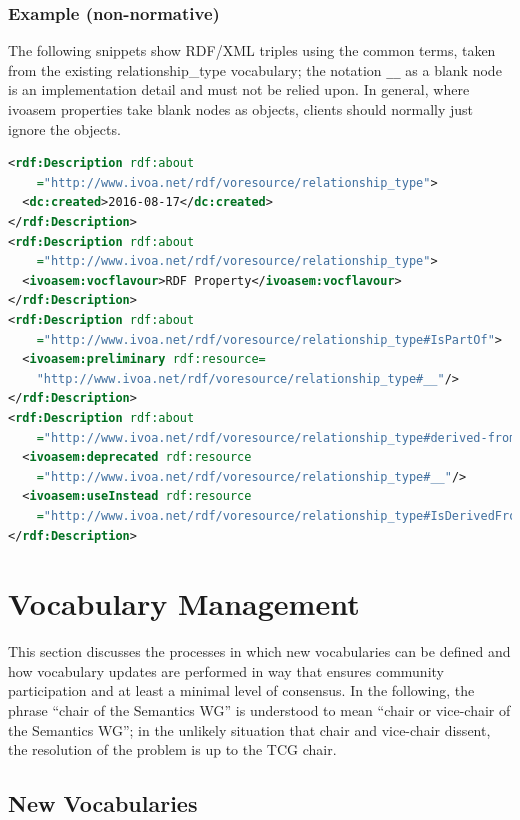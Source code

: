 \documentclass[11pt,a4paper]{ivoa}
\begin{document}
\subsubsection{Example (non-normative)}

The following snippets show RDF/XML triples using the common terms,
taken from the existing relationship\_type vocabulary; the notation
\verb|__| as a blank node is an implementation detail and must not be
relied upon.  In general, where ivoasem properties take blank nodes as
objects, clients should normally just ignore the objects.

\begin{lstlisting}[language=XML]
<rdf:Description rdf:about
    ="http://www.ivoa.net/rdf/voresource/relationship_type">
  <dc:created>2016-08-17</dc:created>
</rdf:Description>
<rdf:Description rdf:about
    ="http://www.ivoa.net/rdf/voresource/relationship_type">
  <ivoasem:vocflavour>RDF Property</ivoasem:vocflavour>
</rdf:Description>
<rdf:Description rdf:about
    ="http://www.ivoa.net/rdf/voresource/relationship_type#IsPartOf">
  <ivoasem:preliminary rdf:resource=
    "http://www.ivoa.net/rdf/voresource/relationship_type#__"/>
</rdf:Description>
<rdf:Description rdf:about
    ="http://www.ivoa.net/rdf/voresource/relationship_type#derived-from">
  <ivoasem:deprecated rdf:resource
    ="http://www.ivoa.net/rdf/voresource/relationship_type#__"/>
  <ivoasem:useInstead rdf:resource
    ="http://www.ivoa.net/rdf/voresource/relationship_type#IsDerivedFrom"/>
</rdf:Description>
\end{lstlisting}


\section{Vocabulary Management}
\label{sect:management}

This section discusses the processes in which new vocabularies can be
defined and how vocabulary updates are performed in way
that ensures community participation and at least a minimal level of consensus.
In the following, the phrase ``chair of the Semantics WG'' is understood
to mean ``chair or vice-chair of the Semantics WG''; in the unlikely
situation that chair and vice-chair dissent, the resolution of the
problem is up to the TCG chair.


\subsection{New Vocabularies}
\label{sect:new-vocabularies}
\end{document}
